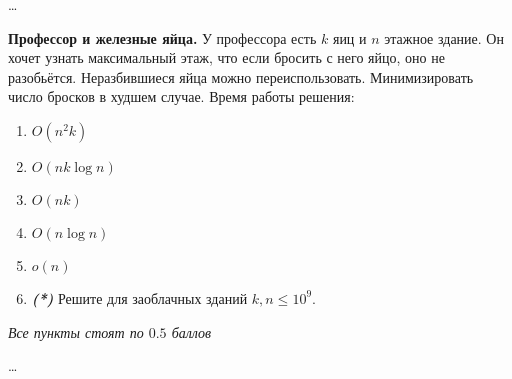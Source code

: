 \begin{solution}
    \dots
\end{solution}


\begin{problem}
    {\bf Профессор и железные яйца.}
    У профессора есть $k$ яиц и $n$ этажное здание. Он хочет узнать максимальный этаж, что если бросить с него яйцо, оно не разобьётся. Неразбившиеся яйца можно переиспользовать. Минимизировать число бросков в худшем случае. Время работы решения:
    \begin{enumerate}
        \item $O(n^2k)$
        \item $O(nk\log n)$
        \item $O(nk)$
        \item $O(n \log n)$
        \item $o(n)$
        \item \textbf{\textit{(*)}} Решите для заоблачных зданий $k, n \le 10^9$.
    \end{enumerate}
    {\footnotesize \textit{Все пункты стоят по $0.5$ баллов}}
\end{problem}

\begin{solution}
    \dots
\end{solution}


\clearpage
